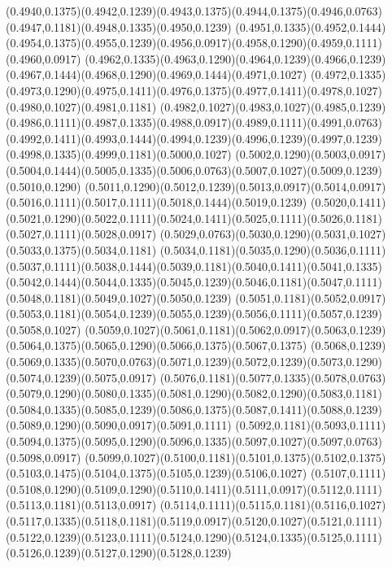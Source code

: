 (0.4940,0.1375)(0.4942,0.1239)(0.4943,0.1375)(0.4944,0.1375)(0.4946,0.0763)(0.4947,0.1181)(0.4948,0.1335)(0.4950,0.1239)
(0.4951,0.1335)(0.4952,0.1444)(0.4954,0.1375)(0.4955,0.1239)(0.4956,0.0917)(0.4958,0.1290)(0.4959,0.1111)(0.4960,0.0917)
(0.4962,0.1335)(0.4963,0.1290)(0.4964,0.1239)(0.4966,0.1239)(0.4967,0.1444)(0.4968,0.1290)(0.4969,0.1444)(0.4971,0.1027)
(0.4972,0.1335)(0.4973,0.1290)(0.4975,0.1411)(0.4976,0.1375)(0.4977,0.1411)(0.4978,0.1027)(0.4980,0.1027)(0.4981,0.1181)
(0.4982,0.1027)(0.4983,0.1027)(0.4985,0.1239)(0.4986,0.1111)(0.4987,0.1335)(0.4988,0.0917)(0.4989,0.1111)(0.4991,0.0763)
(0.4992,0.1411)(0.4993,0.1444)(0.4994,0.1239)(0.4996,0.1239)(0.4997,0.1239)(0.4998,0.1335)(0.4999,0.1181)(0.5000,0.1027)
(0.5002,0.1290)(0.5003,0.0917)(0.5004,0.1444)(0.5005,0.1335)(0.5006,0.0763)(0.5007,0.1027)(0.5009,0.1239)(0.5010,0.1290)
(0.5011,0.1290)(0.5012,0.1239)(0.5013,0.0917)(0.5014,0.0917)(0.5016,0.1111)(0.5017,0.1111)(0.5018,0.1444)(0.5019,0.1239)
(0.5020,0.1411)(0.5021,0.1290)(0.5022,0.1111)(0.5024,0.1411)(0.5025,0.1111)(0.5026,0.1181)(0.5027,0.1111)(0.5028,0.0917)
(0.5029,0.0763)(0.5030,0.1290)(0.5031,0.1027)(0.5033,0.1375)(0.5034,0.1181)
\PST@Solid(0.5034,0.1181)(0.5035,0.1290)(0.5036,0.1111)(0.5037,0.1111)(0.5038,0.1444)(0.5039,0.1181)(0.5040,0.1411)(0.5041,0.1335)
(0.5042,0.1444)(0.5044,0.1335)(0.5045,0.1239)(0.5046,0.1181)(0.5047,0.1111)(0.5048,0.1181)(0.5049,0.1027)(0.5050,0.1239)
(0.5051,0.1181)(0.5052,0.0917)(0.5053,0.1181)(0.5054,0.1239)(0.5055,0.1239)(0.5056,0.1111)(0.5057,0.1239)(0.5058,0.1027)
(0.5059,0.1027)(0.5061,0.1181)(0.5062,0.0917)(0.5063,0.1239)(0.5064,0.1375)(0.5065,0.1290)(0.5066,0.1375)(0.5067,0.1375)
(0.5068,0.1239)(0.5069,0.1335)(0.5070,0.0763)(0.5071,0.1239)(0.5072,0.1239)(0.5073,0.1290)(0.5074,0.1239)(0.5075,0.0917)
(0.5076,0.1181)(0.5077,0.1335)(0.5078,0.0763)(0.5079,0.1290)(0.5080,0.1335)(0.5081,0.1290)(0.5082,0.1290)(0.5083,0.1181)
(0.5084,0.1335)(0.5085,0.1239)(0.5086,0.1375)(0.5087,0.1411)(0.5088,0.1239)(0.5089,0.1290)(0.5090,0.0917)(0.5091,0.1111)
(0.5092,0.1181)(0.5093,0.1111)(0.5094,0.1375)(0.5095,0.1290)(0.5096,0.1335)(0.5097,0.1027)(0.5097,0.0763)(0.5098,0.0917)
(0.5099,0.1027)(0.5100,0.1181)(0.5101,0.1375)(0.5102,0.1375)(0.5103,0.1475)(0.5104,0.1375)(0.5105,0.1239)(0.5106,0.1027)
(0.5107,0.1111)(0.5108,0.1290)(0.5109,0.1290)(0.5110,0.1411)(0.5111,0.0917)(0.5112,0.1111)(0.5113,0.1181)(0.5113,0.0917)
(0.5114,0.1111)(0.5115,0.1181)(0.5116,0.1027)(0.5117,0.1335)(0.5118,0.1181)(0.5119,0.0917)(0.5120,0.1027)(0.5121,0.1111)
(0.5122,0.1239)(0.5123,0.1111)(0.5124,0.1290)(0.5124,0.1335)(0.5125,0.1111)(0.5126,0.1239)(0.5127,0.1290)(0.5128,0.1239)
